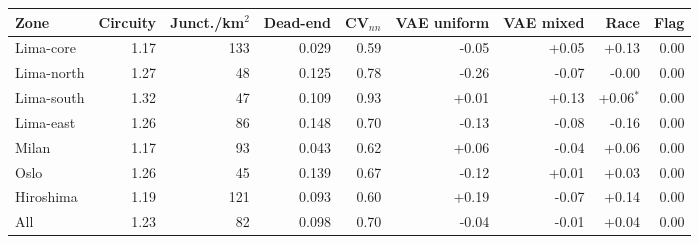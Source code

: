\begin{tabular}{lrrrrrrrr}
\toprule
Zone & Circuity & Junct./km$^2$ & Dead-end & CV$_{nn}$ & VAE uniform & VAE mixed & Race & Flag \\
\midrule
Lima-core & 1.17 & 133 & 0.029 & 0.59 & -0.05 & +0.05 & +0.13 & 0.00 \\
Lima-north & 1.27 & 48 & 0.125 & 0.78 & -0.26 & -0.07 & -0.00 & 0.00 \\
Lima-south & 1.32 & 47 & 0.109 & 0.93 & +0.01 & +0.13 & +0.06$^{*}$ & 0.00 \\
Lima-east & 1.26 & 86 & 0.148 & 0.70 & -0.13 & -0.08 & -0.16 & 0.00 \\
Milan & 1.17 & 93 & 0.043 & 0.62 & +0.06 & -0.04 & +0.06 & 0.00 \\
Oslo & 1.26 & 45 & 0.139 & 0.67 & -0.12 & +0.01 & +0.03 & 0.00 \\
Hiroshima & 1.19 & 121 & 0.093 & 0.60 & +0.19 & -0.07 & +0.14 & 0.00 \\
All & 1.23 & 82 & 0.098 & 0.70 & -0.04 & -0.01 & +0.04 & 0.00 \\
\bottomrule
\end{tabular}
